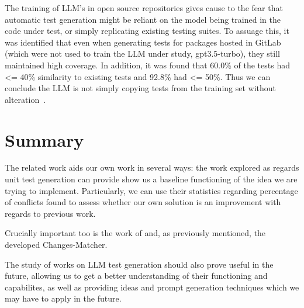 The training of LLM's in open source repositories gives cause to the fear that automatic test generation might be reliant on the model being trained in the code under test, or simply replicating existing testing suites. To assuage this, it was identified that even when generating tests for packages hosted in GitLab (which were not used to train the LLM under study, gpt3.5-turbo), they still maintained high coverage. In addition, it was found that 60.0\% of the tests had <= 40\% similarity to existing tests and 92.8\% had <= 50\%. Thus we can conclude the LLM is not simply copying tests from the training set without alteration~\cite{kn:max}.


\section{Summary}

The related work aids our own work in several ways: the work explored as regards unit test generation can provide show us a baseline functioning of the idea we are trying to implement. Particularly, we can use their statistics regarding percentage of conflicts found to assess whether our own solution is an improvement with regards to previous work.

Crucially important too is the work of \citet{kn:nuno} and, as previously mentioned, the developed Changes-Matcher.

The study of works on LLM test generation should also prove useful in the future, allowing us to get a better understanding of their functioning and capabilites, as well as providing ideas and prompt generation techniques which we may have to apply in the future.
